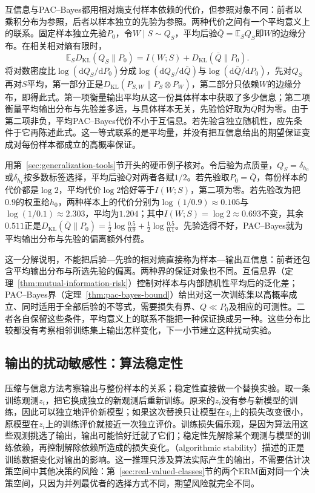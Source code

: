 互信息与PAC--Bayes都用相对熵支付样本依赖的代价，但参照对象不同：前者以乘积分布为参照，后者以样本独立的先验为参照。两种代价之间有一个平均意义上的联系。固定样本独立先验$P_0$，令$W\mid S\sim Q_S$，平均后验$\bar Q=\mathbb E_SQ_S$即$W$的边缘分布。在相关相对熵有限时，
\begin{equation}
 \mathbb E_SD_{\mathrm{KL}}(Q_S\|P_0)=I(W;S)+D_{\mathrm{KL}}(\bar Q\|P_0).
 \label{eq:pac-bayes-information-decomposition}
\end{equation}
将对数密度比$\log(\mathrm dQ_S/\mathrm dP_0)$分成$\log(\mathrm dQ_S/\mathrm d\bar Q)$与$\log(\mathrm d\bar Q/\mathrm dP_0)$，先对$Q_S$再对$S$平均，第一部分正是$D_{\mathrm{KL}}(P_{S,W}\|P_S\otimes P_W)$，第二部分只依赖$W$的边缘分布，即得此式。第一项衡量输出平均从这一份具体样本中获取了多少信息；第二项衡量平均输出分布与先验差多远，与具体样本无关，先验恰好取为$\bar Q$时为零。由于第二项非负，平均PAC--Bayes代价不小于互信息。若先验含独立随机性，应先条件于它再陈述此式。这一等式联系的是平均量，并没有把互信息给出的期望保证变成对每份样本都成立的高概率保证。

用第~\ref{sec:generalization-tools}节开头的硬币例子核对。令后验为点质量，$Q_S=\delta_{h_0}$或$\delta_{h_1}$按多数标签选择，平均后验$\bar Q$对两者各赋$1/2$。若先验取$P_0=\bar Q$，每份样本的代价都是$\log2$，平均代价$\log2$恰好等于$I(W;S)$，第二项为零。若先验改为把$0.9$的权重给$h_0$，两种样本上的代价分别为$\log(1/0.9)\approx0.105$与$\log(1/0.1)\approx2.303$，平均为$1.204$；其中$I(W;S)=\log2\approx0.693$不变，其余$0.511$正是$D_{\mathrm{KL}}(\bar Q\|P_0)=\frac12\log\frac{0.5}{0.9}+\frac12\log\frac{0.5}{0.1}$。先验选得不好，PAC--Bayes就为平均输出分布与先验的偏离额外付费。

这一分解说明，不能把后验—先验的相对熵直接称为样本—输出互信息：前者还包含平均输出分布与所选先验的偏离。两种界的保证对象也不同。互信息界（定理~\ref{thm:mutual-information-risk}）控制对样本与内部随机性平均后的泛化差；PAC--Bayes界（定理~\ref{thm:pac-bayes-bound}）给出对这一次训练集以高概率成立、同时适用于全部后验的不等式，需要损失有界、$Q\ll P_0$及相应的可测性。二者各自保留这些条件，平均意义上的联系不能把一种保证换成另一种。这些分布比较都没有考察相邻训练集上输出怎样变化，下一小节建立这种扰动实验。

\subsection{输出的扰动敏感性：算法稳定性}
\label{sec:algorithmic-stability}

压缩与信息方法考察输出与整份样本的关系；稳定性直接做一个替换实验。取一条训练观测$z_i$，把它换成独立的新观测后重新训练。原来的$z_i$没有参与新模型的训练，因此可以独立地评价新模型；如果这次替换只让模型在$z_i$上的损失改变很小，原模型在$z_i$上的训练评价就接近一次独立评价。训练损失偏乐观，是因为算法用这些观测挑选了输出，输出可能恰好迁就了它们；稳定性先解除某个观测与模型的训练依赖，再控制解除依赖所造成的损失变化。（algorithmic stability）描述的正是训练数据变化对输出的影响。这一推理只涉及算法实际产生的输出，不需要估计决策空间中其他决策的风险：第~\ref{sec:real-valued-classes}节的两个ERM面对同一个决策空间，只因为并列最优者的选择方式不同，期望风险就完全不同。

